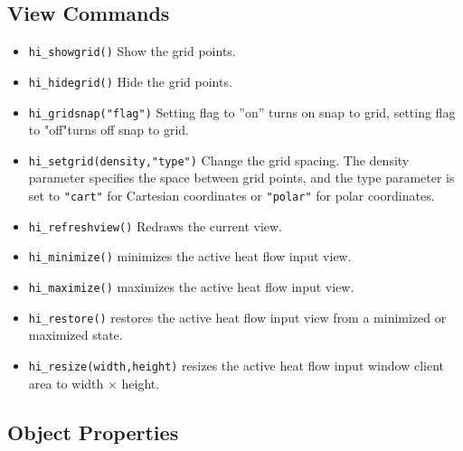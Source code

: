 \subsection{View Commands}
\begin{itemize}
\item \texttt{hi\_showgrid()} Show the grid points.

\item \texttt{hi\_hidegrid()} Hide the grid points.

\item \texttt{hi\_gridsnap("flag")} Setting flag to ''on'' turns on snap to grid,
setting flag to "off"turns off snap to grid.

\item \texttt{hi\_setgrid(density,"type")} Change the grid spacing. The density
parameter specifies the space between grid points, and the type
parameter is set to \texttt{"cart"} for Cartesian coordinates or
\texttt{"polar"} for polar coordinates.

\item \texttt{hi\_refreshview()} Redraws the current view.

\item{\tt hi\_minimize()} minimizes the active heat flow input view.

\item{\tt hi\_maximize()} maximizes the active heat flow input view.

\item{\tt hi\_restore()} restores the active heat flow input view from a
 minimized or maximized state.

\item{\tt hi\_resize(width,height)} resizes the active heat flow input
 window client area to width $\times$ height.

\end{itemize}


\subsection{Object Properties}

